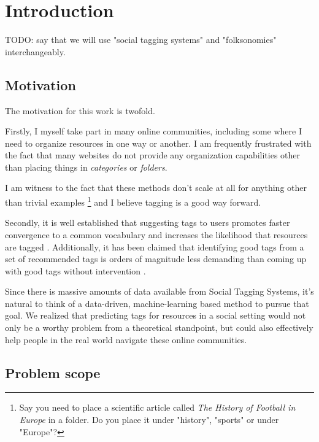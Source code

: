 \chapter{Introduction}\label{chap:intro}

{\color{red} TODO: say that we will use "social tagging systems" and "folksonomies" interchangeably. }

\section{Motivation}\label{section:intro_motivation}

The motivation for this work is twofold. 

Firstly, I myself take part in many online communities, including some where I need to organize resources in one way or another. I am frequently frustrated with the fact that many websites do not provide any organization capabilities other than placing things in \textit{categories} or \textit{folders}.

I am witness to the fact that these methods don't scale at all for anything other than trivial examples \footnote{Say you need to place a scientific article called \textit{The History of Football in Europe} in a folder. Do you place it under "history", "sports" or under "Europe"?} and I believe tagging is a good way forward.

Secondly, it is well established that suggesting tags to users promotes faster convergence to a common vocabulary \citep{marlow_etal_2006,hassan_etal_2009, dattolo_etal_2010} and increases the likelihood that resources are tagged \citep{dattolo_etal_2010,floeck_etal_2010}. Additionally, it has been claimed that identifying good tags from a set of recommended tags is orders of magnitude less demanding than coming up with good tags without intervention \citep{marinho_etal_2012}.

Since there is massive amounts of data available from Social Tagging Systems, it's natural to think of a data-driven, machine-learning based method to pursue that goal. We realized that predicting tags for resources in a social setting would not only be a worthy problem from a theoretical standpoint, but could also effectively help people in the real world navigate these online communities.

\section{Problem scope}\label{section:intro_problem}

